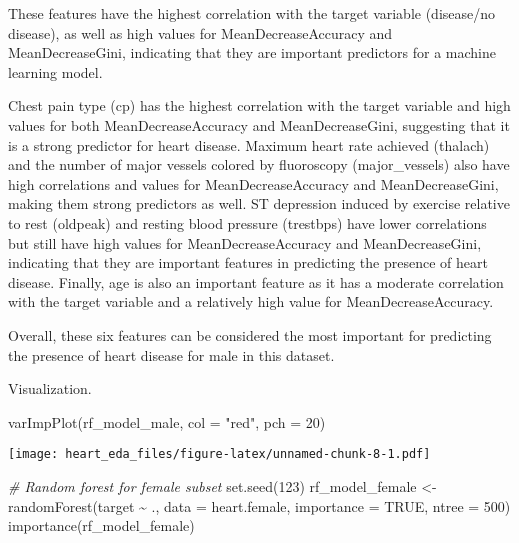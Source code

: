 \documentclass[
]{article}
\newenvironment{Shaded}{\begin{snugshade}}{\end{snugshade}}
\newcommand{\AttributeTok}[1]{\textcolor[rgb]{0.77,0.63,0.00}{#1}}
\newcommand{\CommentTok}[1]{\textcolor[rgb]{0.56,0.35,0.01}{\textit{#1}}}
\newcommand{\ConstantTok}[1]{\textcolor[rgb]{0.00,0.00,0.00}{#1}}
\newcommand{\DecValTok}[1]{\textcolor[rgb]{0.00,0.00,0.81}{#1}}
\newcommand{\FunctionTok}[1]{\textcolor[rgb]{0.00,0.00,0.00}{#1}}
\newcommand{\NormalTok}[1]{#1}
\newcommand{\OtherTok}[1]{\textcolor[rgb]{0.56,0.35,0.01}{#1}}
\newcommand{\SpecialCharTok}[1]{\textcolor[rgb]{0.00,0.00,0.00}{#1}}
\newcommand{\StringTok}[1]{\textcolor[rgb]{0.31,0.60,0.02}{#1}}
\begin{document}
These features have the highest correlation with the target variable
(disease/no disease), as well as high values for MeanDecreaseAccuracy
and MeanDecreaseGini, indicating that they are important predictors for
a machine learning model.

Chest pain type (cp) has the highest correlation with the target
variable and high values for both MeanDecreaseAccuracy and
MeanDecreaseGini, suggesting that it is a strong predictor for heart
disease. Maximum heart rate achieved (thalach) and the number of major
vessels colored by fluoroscopy (major\_vessels) also have high
correlations and values for MeanDecreaseAccuracy and MeanDecreaseGini,
making them strong predictors as well. ST depression induced by exercise
relative to rest (oldpeak) and resting blood pressure (trestbps) have
lower correlations but still have high values for MeanDecreaseAccuracy
and MeanDecreaseGini, indicating that they are important features in
predicting the presence of heart disease. Finally, age is also an
important feature as it has a moderate correlation with the target
variable and a relatively high value for MeanDecreaseAccuracy.

Overall, these six features can be considered the most important for
predicting the presence of heart disease for male in this dataset.

Visualization.

\begin{Shaded}
\begin{Highlighting}[]
\FunctionTok{varImpPlot}\NormalTok{(rf\_model\_male, }\AttributeTok{col =} \StringTok{"red"}\NormalTok{, }\AttributeTok{pch =} \DecValTok{20}\NormalTok{)}
\end{Highlighting}
\end{Shaded}

\texttt{[image: heart\_eda\_files/figure-latex/unnamed-chunk-8-1.pdf]}

\begin{Shaded}
\begin{Highlighting}[]
\CommentTok{\# Random forest for female subset}
\FunctionTok{set.seed}\NormalTok{(}\DecValTok{123}\NormalTok{)}
\NormalTok{rf\_model\_female }\OtherTok{\textless{}{-}} \FunctionTok{randomForest}\NormalTok{(target }\SpecialCharTok{\textasciitilde{}}\NormalTok{ ., }\AttributeTok{data =}\NormalTok{ heart.female, }\AttributeTok{importance =} \ConstantTok{TRUE}\NormalTok{, }\AttributeTok{ntree =} \DecValTok{500}\NormalTok{)}
\FunctionTok{importance}\NormalTok{(rf\_model\_female)}
\end{Highlighting}
\end{Shaded}
\end{document}
